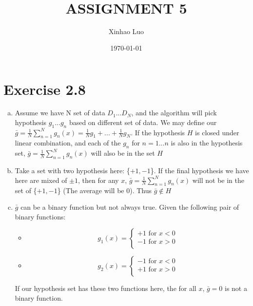\documentclass{article}
\title{\bf \Large ASSIGNMENT 5}
\author{Xinhao Luo}
\date{\today}
\def\math#1{$#1$}
\begin{document}
\maketitle
\medskip

\section{Exercise 2.8}

\begin{enumerate}[a)]
    \item Assume we have N set of data \math{D_1 ... D_N}, and the algorithm will pick hypothesis \math{g_1 ... g_n} based on different set of data. We may define our \math{\bar{g} = \frac{1}{N}\sum_{n = 1}^Ng_n(x) = \frac{1}{N}g_1 + ... + \frac{1}{N}g_N}. If the hypothesis \math{H} is closed under linear combination, and each of the \math{g_n} for \math{n = 1...n} is also in the hypothesis set, \math{\bar{g} = \frac{1}{N}\sum_{n = 1}^Ng_n(x)} will also be in the set \math{H}
    \item Take a set with two hypothesis here: \{\math{+1, -1}\}. If the final hypothesis we have here are mixed of \math{\pm1}, then for any \math{x}, \math{\bar{g} = \frac{1}{N}\sum_{n = 1}^Ng_n(x)} will not be in the set of \{\math{+1, -1}\} (The average will be 0). Thus \math{\bar{g} \notin H}
    \item \math{\bar{g}} can be a binary function but not always true. Given the following pair of binary functions: 
        \begin{itemize}
            \item \begin{equation}
                g_1(x) = \begin{cases}
                    +1 \text{ for } x < 0 \\
                    -1 \text{ for } x > 0 \\
                    \end{cases}   
            \end{equation}
        \item \begin{equation}
                g_2(x) = \begin{cases}
                    -1 \text{ for } x < 0 \\
                    +1 \text{ for } x > 0 \\
                    \end{cases}   
            \end{equation}
        \end{itemize}
    If our hypothesis set has these two functions here, the for all \math{x}, \math{\bar{g} = 0} is not a binary function.
\end{enumerate}
\end{document}
